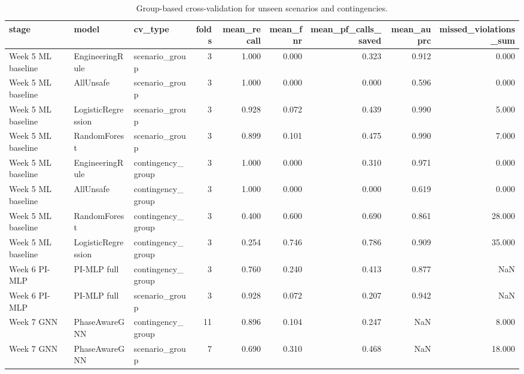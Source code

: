 \begin{table}
\caption{Group-based cross-validation for unseen scenarios and contingencies.}
\label{tab:group_cv}
\begin{tabular}{lllrrrrrr}
\toprule
stage & model & cv_type & folds & mean_recall & mean_fnr & mean_pf_calls_saved & mean_auprc & missed_violations_sum \\
\midrule
Week 5 ML baseline & EngineeringRule & scenario\_group & 3 & 1.000 & 0.000 & 0.323 & 0.912 & 0.000 \\
Week 5 ML baseline & AllUnsafe & scenario\_group & 3 & 1.000 & 0.000 & 0.000 & 0.596 & 0.000 \\
Week 5 ML baseline & LogisticRegression & scenario\_group & 3 & 0.928 & 0.072 & 0.439 & 0.990 & 5.000 \\
Week 5 ML baseline & RandomForest & scenario\_group & 3 & 0.899 & 0.101 & 0.475 & 0.990 & 7.000 \\
Week 5 ML baseline & EngineeringRule & contingency\_group & 3 & 1.000 & 0.000 & 0.310 & 0.971 & 0.000 \\
Week 5 ML baseline & AllUnsafe & contingency\_group & 3 & 1.000 & 0.000 & 0.000 & 0.619 & 0.000 \\
Week 5 ML baseline & RandomForest & contingency\_group & 3 & 0.400 & 0.600 & 0.690 & 0.861 & 28.000 \\
Week 5 ML baseline & LogisticRegression & contingency\_group & 3 & 0.254 & 0.746 & 0.786 & 0.909 & 35.000 \\
Week 6 PI-MLP & PI-MLP full & contingency\_group & 3 & 0.760 & 0.240 & 0.413 & 0.877 & NaN \\
Week 6 PI-MLP & PI-MLP full & scenario\_group & 3 & 0.928 & 0.072 & 0.207 & 0.942 & NaN \\
Week 7 GNN & PhaseAwareGNN & contingency\_group & 11 & 0.896 & 0.104 & 0.247 & NaN & 8.000 \\
Week 7 GNN & PhaseAwareGNN & scenario\_group & 7 & 0.690 & 0.310 & 0.468 & NaN & 18.000 \\
\bottomrule
\end{tabular}
\end{table}
